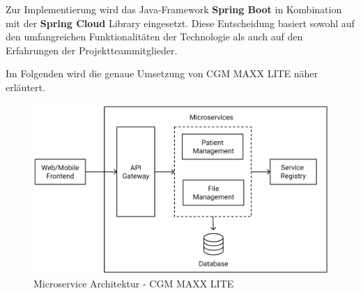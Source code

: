    Zur Implementierung wird das Java-Framework \textbf{Spring Boot} in Kombination mit der \textbf{Spring Cloud} Library eingesetzt.
    Diese Entscheidung basiert sowohl auf den umfangreichen Funktionalitäten der Technologie als auch auf den Erfahrungen der Projektteammitglieder.

    Im Folgenden wird die genaue Umsetzung von CGM MAXX LITE näher erläutert.

    \begin{figure}[H]
        \centering
        \includegraphics[width=0.95\linewidth]{images/EA/microservice-architecture.png}
        \caption{Microservice Architektur - CGM MAXX LITE}
        \label{fig:cgm-maxx-lite-microservices-architecture}
    \end{figure}

